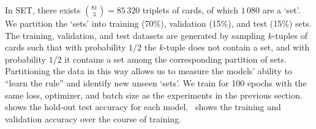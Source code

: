
In SET, there exists $\binom{81}{3} = 85\,320$ triplets of cards, of which $1\,080$ are a `set'. We partition the `sets' into training (70\%), validation (15\%), and test (15\%) sets. The training, validation, and test datasets are generated by sampling $k$-tuples of cards such that with probability $1/2$ the $k$-tuple does not contain a set, and with probability $1/2$ it contains a set among the corresponding partition of sets. Partitioning the data in this way allows us to measure the models' ability to ``learn the rule'' and identify new unseen `sets'. We train for 100 epochs with the same loss, optimizer, and batch size as the experiments in the previous section.~ shows the hold-out test accuracy for each model.~ shows the training and validation accuracy over the course of training.

